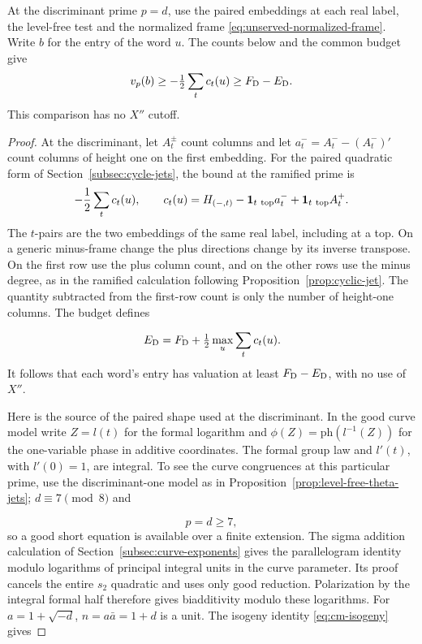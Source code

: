 \begin{proposition}\label{prop:unserved-discriminant-entries}
At the discriminant prime \(p=d\), use the paired embeddings at
each real label, the level-free test and the normalized frame
\eqref{eq:unserved-normalized-frame}. Write \(b\) for the entry of the word \(u\). The counts below and the common budget give
\[
 v_p(b)\ge-\tfrac12\sum_t c_t(u)\ge F_{\rm D}-E_{\rm D}.
\]
 This comparison has no \(X''\) cutoff.
\end{proposition}

\begin{proof}

At the discriminant, let \(A_t^\pm\) count columns and
let \(a_t^-=A_t^--(A_t^-)'\) count columns of height one
on the first embedding. For the paired quadratic form of Section~\ref{subsec:cycle-jets}, the bound at the ramified prime is \[ -\frac12\sum_t c_t(u),\qquad c_t(u)=H_{(-,t)}-\mathbf1_{t\ {\rm top}}a_t^- +\mathbf1_{t\ {\rm top}}A_t^+ . \] The \(t\)-pairs are the two embeddings of the same real label, including at a top. On a generic
minus-frame change the plus directions change by its
inverse transpose. On the first row use the plus
column count, and on the other rows use the minus
degree, as in the ramified calculation following
Proposition~\ref{prop:cyclic-jet}. The quantity subtracted
from the first-row count is only the number of
height-one columns. The budget defines

\[
  E_{\rm D}=F_{\rm D}+\tfrac12\max_u\sum_t c_t(u).
\]
It follows that each word's entry has valuation at
least \(F_{\rm D}-E_{\rm D}\), with no use of \(X''\).


Here is the source of the paired shape used at the
discriminant. In the good curve model write \(Z=l(t)\) for
the formal logarithm and \(\phi(Z)=\mathrm{ph}(l^{-1}(Z))\)
for the one-variable phase in additive coordinates. The
formal group law and \(l'(t)\), with \(l'(0)=1\), are
integral. To see the curve congruences at this particular prime,
use the discriminant-one model as in
Proposition~\ref{prop:level-free-theta-jets}; \(d\equiv7\pmod8\) and

\[
  p=d\ge7,
\]
 so a good short equation is available over a finite
extension. The sigma addition calculation of
Section~\ref{subsec:curve-exponents} gives the parallelogram
identity modulo logarithms of principal integral units in the
curve parameter. Its proof cancels the entire \(s_2\) quadratic
and uses only good reduction. Polarization by the integral formal
half therefore gives biadditivity modulo these logarithms. For
\(a=1+\sqrt{-d}\), \(n=a\bar a=1+d\) is a unit. The isogeny
identity \eqref{eq:cm-isogeny} gives


\end{proof}

